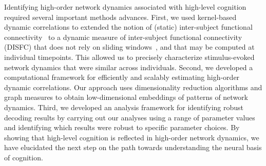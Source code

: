 \documentclass[english]{article}
\begin{document}
Identifying high-order network dynamics associated with high-level
cognition required several important methods advances.  First, we used
kernel-based dynamic correlations to extended the notion of (static)
inter-subject functional connectivity~\citep{SimoEtal16} to a dynamic
measure of inter-subject functional connectivity (DISFC) that does not
rely on sliding windows~\citep[e.g., as in][]{MannEtal18}, and that
may be computed at individual timepoints.  This allowed us to
precisely characterize stimulus-evoked network dynamics that were
similar across individuals.  Second, we developed a computational
framework for efficiently and scalably estimating high-order dynamic
correlations.  Our approach uses dimensionality reduction algorithms
and graph measures to obtain low-dimensional embeddings of patterns of
network dynamics.  Third, we developed an analysis framework for
identifying robust decoding results by carrying out our analyses using
a range of parameter values and identifying which results were robust
to specific parameter choices. By showing that high-level cognition is
reflected in high-order network dynamics, we have elucidated the next
step on the path towards understanding the neural basis of cognition.
\end{document}
